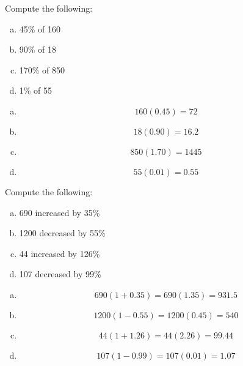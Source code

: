 \documentclass[11pt,letterpaper]{article}
\begin{document}

 Compute the following:
	\begin{enumerate}[(a)]
	\item 45\% of 160
	\item 90\% of 18
	\item 170\% of 850
	\item 1\% of 55
	\end{enumerate} \pspace

\sol
\begin{enumerate}[(a)]
\item 
	\[
	160(0.45)= 72
	\] \pspace

\item 
	\[
	18(0.90)= 16.2
	\] \pspace

\item 
	\[
	850(1.70)= 1445
	\] \pspace

\item 
	\[
	55(0.01)= 0.55
	\]
\end{enumerate}



\newpage



 Compute the following:
	\begin{enumerate}[(a)]
	\item 690 increased by 35\%
	\item 1200 decreased by 55\%
	\item 44 increased by 126\%
	\item 107 decreased by 99\%
	\end{enumerate} \pspace

\sol
\begin{enumerate}[(a)]
\item 
	\[
	690(1 + 0.35)= 690(1.35)= 931.5
	\] \pspace

\item 
	\[
	1200(1 - 0.55)= 1200(0.45)= 540
	\] \pspace

\item 
	\[
	44(1 + 1.26)= 44(2.26)= 99.44
	\] \pspace

\item 
	\[
	107(1 - 0.99)= 107(0.01)= 1.07
	\]
\end{enumerate}
\end{document}
